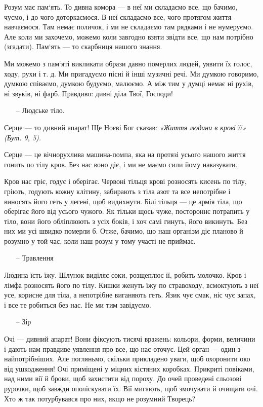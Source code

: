 \documentclass[main.tex]{subfiles}
\begin{document}
Розум має пам`ять. То дивна комора — в неї ми складаємо все, що бачимо, чуємо, і до чого доторкаємося. В неї складаємо все, чого протягом життя навчаємося. Там немає поличок, і ми не складаємо там рядками і не нумеруємо. Але коли ми захочемо, можемо коли завгодно взяти звідти все, що нам потрібно (згадати). Пам`ять — то скарбниця нашого знання.

Ми можемо з пам`яті викликати образи давно померлих людей, уявити їх голос, ходу, рухи і т. д. Ми пригадуємо пісні й інші музичні речі. Ми думкою говоримо, думкою співаємо, думкою будуємо, малюємо. А між тим у думці немає ні рухів, ні звуків, ні фарб.
Правдиво: дивні діла Твої, Господи!

\begin{itemize}
 \item[--]{Людське тіло.}   
\end{itemize}
Серце — то дивний апарат! Ще Ноєві Бог сказав: \emph{«Життя людини в крові її» (Бут. 9, 5).}

Серце — це вічнорухлива машина-помпа, яка на протязі
усього нашого життя гонить по тілу кров. Без нас воно діє, і ми не маємо сили йому наказувати.

Кров нас гріє, годує і оберігає. Червоні тільця крові розносять кисень по тілу, гріють, годують кожну клітину, забирають з тіла азот та все непотрібне і виносять його геть у легені, щоб видихнути. Білі тільця — це армія тіла, що оберігає його від усього чужого. Як тільки щось чуже, постороннє потрапить у тіло, вони його обліплюють з усіх боків, і хоч самі гинуть, його викинуть. Без них ми усі швидко померли б. Отже, бачимо, що наш організм діє планово й розумно у той час, коли наш розум у тому участі не приймає.

\begin{itemize}
    \item[--]{Травлення}   
\end{itemize}

Людина їсть їжу. Шлунок виділяє соки, розщеплює її, робить молочко. Кров і лімфа розносять його по тілу. Кишки женуть їжу по стравоходу, всмоктують з неї усе, корисне для тіла, а непотрібне виганяють геть. Язик чує смак, ніс чує запах, і все те робиться без нас. Не ми тим завідуємо.

\begin{itemize}
    \item[--]{Зір}   
\end{itemize}

Очі — дивний апарат! Вони фіксують тисячі
вражень: кольори, форми, величини і дають нам правдиве уявлення про все, що нас оточує. Цей орган — один з найпотрібніших. Але погляньмо, скільки прикладено уваги, щоб охоронити око від ушкодження! Очі приміщені у міцних кістяних коробках. Прикриті повіками, над ними вії й брови, щоб захистити від пороху. До очей проведені сльозові рурочки, щоб завжди ополіскувати їх. Вії мигають, щоб змочувати й очищати очі. Хто ж так потурбувався про них, якщо не розумний Творець?
\end{document}
